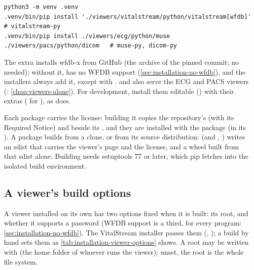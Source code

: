 \begin{lstlisting}[style=shell]
python3 -m venv .venv
.venv/bin/pip install './viewers/vitalstream/python/vitalstream[wfdb]' # vitalstream-py
.venv/bin/pip install ./viewers/ecg/python/muse ./viewers/pacs/python/dicom   # muse-py, dicom-py
\end{lstlisting}
The \code{[wfdb]} extra installs wfdb-x from GitHub (the archive of the pinned commit; no
 needed); without it,  has no WFDB support
(\cref{sec:installation-no-wfdb}), and the installers always add it, except with
.  and  also serve the ECG and PACS viewers
(: \cref{chap:viewers-alone}). For development, install them editable
() with their
\code{[test]} extras ( for ), as 
does.

Each package carries the license: building it copies the repository's  (with its
Required Notice) and  beside its , and they are
installed with the package (in its ). A package builds from a clone,
or from its source distribution: 
(and , ) writes an sdist that
carries the viewer's page and the license, and a wheel built from that sdist alone. Building
needs setuptools 77 or later, which pip fetches into the isolated build environment.

\subsection{A viewer's build options}
\label{sec:installation-viewer-options}

A viewer installed on its own has two options fixed when it is built: its root, and whether it
supports a password (WFDB support is a third, for every program: \cref{sec:installation-no-wfdb}).
The VitalStream installer passes them (, );
a build by hand sets them as \cref{tab:installation-viewer-options} shows. A root may be written
with \code{\textasciitilde} (the home folder of whoever runs the viewer); unset, the root is the
whole file system.

